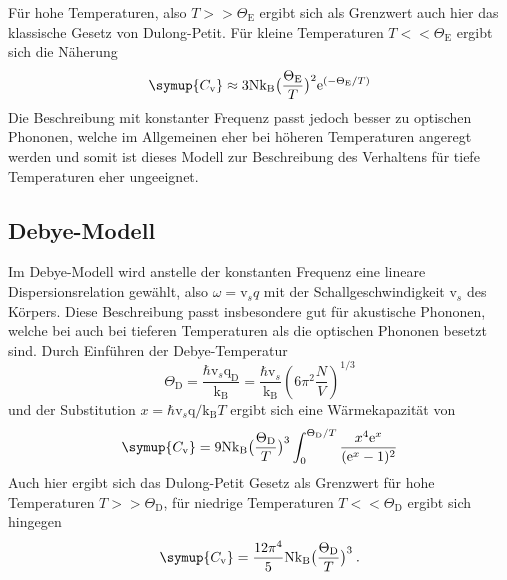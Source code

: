 Für hohe Temperaturen, also $T >> \Theta_{\text{E}}$ ergibt sich als Grenzwert
auch hier das klassische Gesetz von Dulong-Petit. Für kleine Temperaturen
$T << \Theta_{\text{E}}$ ergibt sich die Näherung
\begin{equation}
  \symup{C_{\text{v}}} \approx 3\text{N}\text{k}_{\text{B}}\bigl(\frac{\Theta_{\text{E}}}{T}\bigr)^2
  \text{e}^{(-\Theta_{\text{E}}/T)}
  \label{eqn:ChochE}
\end{equation}
Die Beschreibung mit konstanter Frequenz passt jedoch besser zu optischen Phononen,
welche im Allgemeinen eher bei höheren Temperaturen angeregt werden und somit ist
dieses Modell zur Beschreibung des
Verhaltens für tiefe Temperaturen eher ungeeignet.

\subsection{Debye-Modell}
Im Debye-Modell wird anstelle der konstanten Frequenz eine lineare Dispersionsrelation
gewählt, also $ \omega = \text{v}_sq$ mit der Schallgeschwindigkeit
$\text{v}_s$ des Körpers. Diese Beschreibung passt insbesondere gut für
akustische Phononen, welche bei auch bei tieferen Temperaturen als die optischen Phononen
besetzt sind.
Durch Einführen der Debye-Temperatur
\begin{equation}
  \Theta_{\text{D}} = \frac{\hbar\text{v}_s\text{q}_{\text{D}}}{\text{k}_{\text{B}}}
  = \frac{\hbar\text{v}_s}{\text{k}_{\text{B}}}(6\pi^2\frac{N}{V})^{1/3}
  \label{eqn:TDebye}
\end{equation}
und der Substitution $ x=\hbar\text{v}_s\text{q} /\text{k}_{\text{B}}T $
ergibt sich eine Wärmekapazität von
\begin{equation}
  \symup{C_{\text{v}}} = 9\text{N}\text{k}_{\text{B}}\bigl(\frac{\Theta_{\text{D}}}{T}\bigr)^3
  \int_0^{\Theta_{\text{D}}/T} \frac{x^4\text{e}^x}{(\text{e}^x-1)^2}
  \label{eqn:CDebye}
\end{equation}
Auch hier ergibt sich das Dulong-Petit Gesetz als Grenzwert für hohe Temperaturen
$T>>\Theta_{\text{D}}$, für niedrige Temperaturen $T<<\Theta_{\text{D}}$ ergibt sich hingegen
\begin{equation}
  \symup{C_{\text{v}}} = \frac{12\pi^4}{5}\text{N}\text{k}_{\text{B}}\bigl(\frac{\Theta_{\text{D}}}{T}\bigr)^3 \:.
  \label{eqn:ChochD}
\end{equation}
